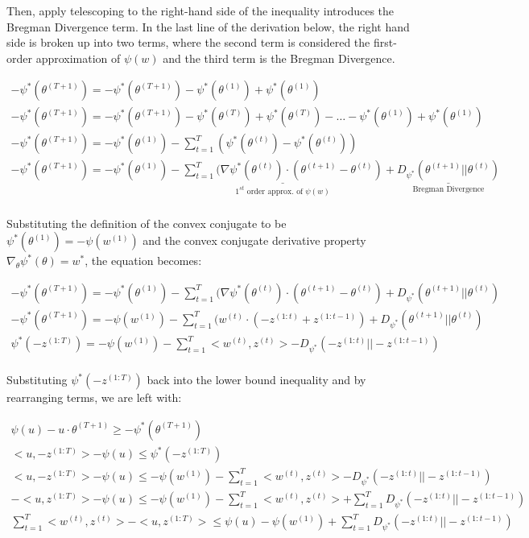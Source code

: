 \documentclass[11pt]{article}
\begin{document}
Then, apply telescoping to the right-hand side of the inequality introduces the Bregman Divergence term. In the last line of the derivation below, the right hand side is broken up into two terms, where the second term is considered the first-order approximation of $\psi (w)$ and the third term is the Bregman Divergence.

\begin{gather*}
    -\psi^* (\theta^{(T+1)}) = -\psi^* (\theta^{(T+1)}) - \psi^* (\theta^{(1)}) + \psi^* (\theta^{(1)}) \\
    -\psi^* (\theta^{(T+1)}) = -\psi^* (\theta^{(T+1)}) - \psi^* (\theta^{(T)}) + \psi^* (\theta^{(T)}) - \dots - \psi^* (\theta^{(1)}) + \psi^* (\theta^{(1)}) \\ 
    -\psi^* (\theta^{(T+1)}) = - \psi^* (\theta^{(1)}) - \sum_{t=1}^T (\psi^* (\theta^{(t)}) - \psi^* (\theta^{(t)})) \\ 
    -\psi^* (\theta^{(T+1)}) = - \psi^* (\theta^{(1)}) - \underset{\text{$1^{st}$ order approx. of $\psi (w)$}}{\underline{\sum_{t=1}^T (\nabla \psi^* (\theta^{(t)}) \cdot (\theta^{(t+1)} - \theta^{(t)})}} + \underset{\text{Bregman Divergence}}{\underline{D_{\psi^*} (\theta^{(t+1)}||\theta^{(t)})}} \\
\end{gather*}

Substituting the definition of the convex conjugate to be $\psi^* (\theta^{(1)}) = -\psi (w^{(1)})$ and the convex conjugate derivative property $\nabla_\theta \psi^* (\theta) = w^*$, the equation becomes:

\begin{gather*}
    -\psi^* (\theta^{(T+1)}) = - \psi^* (\theta^{(1)}) - \sum_{t=1}^T (\nabla \psi^* (\theta^{(t)}) \cdot (\theta^{(t+1)} - \theta^{(t)}) + D_{\psi^*} (\theta^{(t+1)}||\theta^{(t)}) \\
    -\psi^* (\theta^{(T+1)}) = - \psi (w^{(1)}) - \sum_{t=1}^T (w^{(t)} \cdot (-z^{(1:t)} + z^{(1:t-1)}) + D_{\psi^*} (\theta^{(t+1)}||\theta^{(t)}) \\ 
    \psi^* (-z^{(1:T)}) = -\psi (w^{(1)}) - \sum_{t=1}^T <w^{(t)}, z^{(t)}> - D_{\psi^*} (-z^{(1:t)}||-z^{(1:t-1)}) \\ 
\end{gather*}

Substituting $\psi^* (-z^{(1:T)})$ back into the lower bound inequality and by rearranging terms, we are left with:

\begin{gather*}
    \psi (u) - u \cdot \theta^{(T+1)} \geq -\psi^* (\theta^{(T+1)}) \\ 
     <u, -z^{(1:T)} > - \psi (u) \leq \psi^* (-z^{(1:T)}) \\ 
     <u, -z^{(1:T)} > - \psi (u) \leq -\psi (w^{(1)}) - \sum_{t=1}^T <w^{(t)}, z^{(t)}> - D_{\psi^*} (-z^{(1:t)}||-z^{(1:t-1)}) \\ 
     -<u, z^{(1:T)} > - \psi (u) \leq -\psi (w^{(1)}) - \sum_{t=1}^T <w^{(t)}, z^{(t)}> + \sum_{t=1}^T D_{\psi^*} (-z^{(1:t)}||-z^{(1:t-1)}) \\ 
     \sum_{t=1}^T <w^{(t)}, z^{(t)}> - <u, z^{(1:T)} > \leq \psi (u) - \psi (w^{(1)}) + \sum_{t=1}^T D_{\psi^*} (-z^{(1:t)}||-z^{(1:t-1)}) 
\end{gather*}
\end{document}
